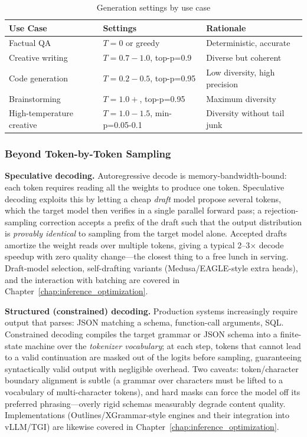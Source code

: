 \begin{table}[H]
\centering
\caption{Generation settings by use case}
\begin{tabularx}{\textwidth}{lXX}
\toprule
\textbf{Use Case} & \textbf{Settings} & \textbf{Rationale} \\
\midrule
Factual QA & $T=0$ or greedy & Deterministic, accurate \\
Creative writing & $T=0.7-1.0$, top-p=0.9 & Diverse but coherent \\
Code generation & $T=0.2-0.5$, top-p=0.95 & Low diversity, high precision \\
Brainstorming & $T=1.0+$, top-p=0.95 & Maximum diversity \\
High-temperature creative & $T=1.0-1.5$, min-p=0.05-0.1 & Diversity without tail junk \\
\bottomrule
\end{tabularx}
\end{table}

\subsubsection{Beyond Token-by-Token Sampling}

\textbf{Speculative decoding.} Autoregressive decode is memory-bandwidth-bound: each token requires reading all the weights to produce one token. Speculative decoding exploits this by letting a cheap \textit{draft} model propose several tokens, which the target model then verifies in a single parallel forward pass; a rejection-sampling correction accepts a prefix of the draft such that the output distribution is \emph{provably identical} to sampling from the target model alone. Accepted drafts amortize the weight reads over multiple tokens, giving a typical 2--3$\times$ decode speedup with zero quality change---the closest thing to a free lunch in serving. Draft-model selection, self-drafting variants (Medusa/EAGLE-style extra heads), and the interaction with batching are covered in Chapter~\ref{chap:inference_optimization}.

\textbf{Structured (constrained) decoding.} Production systems increasingly require output that parses: JSON matching a schema, function-call arguments, SQL. Constrained decoding compiles the target grammar or JSON schema into a finite-state machine over the \emph{tokenizer vocabulary}; at each step, tokens that cannot lead to a valid continuation are masked out of the logits before sampling, guaranteeing syntactically valid output with negligible overhead. Two caveats: token/character boundary alignment is subtle (a grammar over characters must be lifted to a vocabulary of multi-character tokens), and hard masks can force the model off its preferred phrasing---overly rigid schemas measurably degrade content quality. Implementations (Outlines/XGrammar-style engines and their integration into vLLM/TGI) are likewise covered in Chapter~\ref{chap:inference_optimization}.

